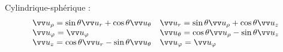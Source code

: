 \documentclass[../main.tex]{subfiles}
\begin{document}
Cylindrique-sphérique : 
\[
  \begin{array}{ll}
    \urho = \sin\theta\ur + \cos\theta\utheta &
    \ur =\sin\theta\urho + \cos\theta\uz\\ 

    \uphi = \uphi &
    \utheta = \cos\theta\urho - \sin\theta\uz \\

    \uz = \cos\theta\ur - \sin\theta\utheta &
    \uphi = \uphi
  \end{array}
\]
\end{document}
